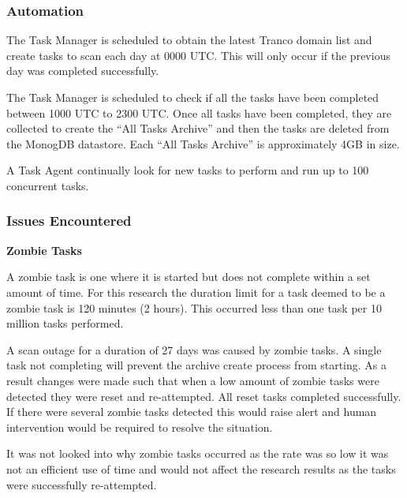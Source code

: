 \documentclass{mscreport}
\begin{document}
\noindent
\clearpage

\subsubsection{Automation}

The Task Manager is scheduled to obtain the latest Tranco domain list and create tasks to scan each day at 0000 UTC. This will only occur if the previous day was completed successfully.

\vspace{0.3cm} \noindent
The Task Manager is scheduled to check if all the tasks have been completed between 1000 UTC to 2300 UTC. Once all tasks have been completed, they are collected to create the ``All Tasks Archive'' and then the tasks are deleted from the MonogDB datastore. Each ``All Tasks Archive'' is approximately 4GB in size.

\vspace{0.3cm} \noindent
A Task Agent continually look for new tasks to perform and run up to 100 concurrent tasks.

\subsubsection{Issues Encountered}
\label{subsection:issues_encountered}

\textbf{Zombie Tasks}

\vspace{0.2cm} \noindent
A zombie task is one where it is started but does not complete within a set amount of time. For this research the duration limit for a task deemed to be a zombie task is 120 minutes (2 hours). This occurred less than one task per 10 million tasks performed.

\vspace{0.2cm} \noindent
A scan outage for a duration of 27 days was caused by zombie tasks. A single task not completing will prevent the archive create process from starting. As a result changes were made such that when a low amount of zombie tasks were detected they were reset and re-attempted. All reset tasks completed successfully. If there were several zombie tasks detected this would raise alert and human intervention would be required to resolve the situation.

\vspace{0.2cm} \noindent
It was not looked into why zombie tasks occurred as the rate was so low it was not an efficient use of time and would not affect the research results as the tasks were successfully re-attempted.
\end{document}
